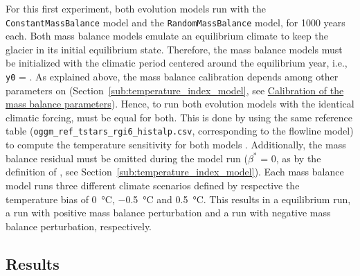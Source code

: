         For this first experiment, both evolution models run with the \lstinline`ConstantMassBalance` model and the \lstinline`RandomMassBalance` model, for 1000 years each. Both mass balance models emulate an equilibrium climate to keep the glacier in its initial equilibrium state. Therefore, the mass balance models must be initialized with the climatic period centered around the equilibrium year, i.e., \lstinline`y0` = \tstar{}. As explained above, the mass balance calibration depends among other parameters on \tstar{} (Section~\ref{sub:temperature_index_model}, see \hyperref[ssub:mb_calib]{Calibration of the mass balance parameters}). Hence, to run both evolution models with the identical climatic forcing, \tstar{} must be equal for both. This is done by using the same \tstar{} reference table (\lstinline`oggm_ref_tstars_rgi6_histalp.csv`, corresponding to the flowline model) to compute the temperature sensitivity \mustar{} for both models . Additionally, the mass balance residual must be omitted during the model run ($\beta^*$ = 0, as by the definition of \mustar{}, see Section~\ref{sub:temperature_index_model}). Each mass balance model runs three different climate scenarios defined by respective the temperature bias of \SI{0}{\celsius}, \SI{-0.5}{\celsius} and \SI{+0.5}{\celsius}. This results in a equilibrium run, a run with positive mass balance perturbation and a run with negative mass balance perturbation, respectively.


    \subsection{Results} %
    \label{sub:results_test_case}

